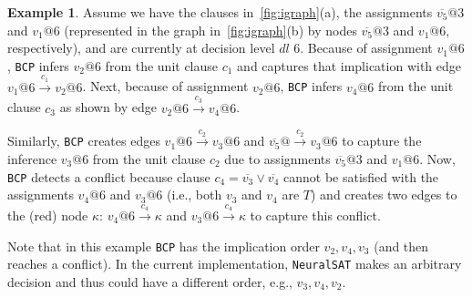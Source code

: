 \documentclass[oneside,11pt,dvipsnames]{book}
\numberwithin{equation}{section}
\theoremstyle{definition}
\newtheorem{example}{Example}[section]
\theoremstyle{remark}
\newcommand{\tvn}[1]{\iftoggle{usecomment}{{\color{red}{[TVN]: #1}}}{}}
\newcommand{\tool}{\texttt{NeuralSAT}}
\begin{document}
\begin{example}
    Assume we have the clauses in~\autoref{fig:igraph}(a), the assignments $\overline{v_5}@3$ and $v_1@6$ (represented in the graph in~\autoref{fig:igraph}(b) by nodes  $\overline{v_5}@3$ and $v_1@6$, respectively), and are currently at decision level $dl$ 6.
Because of assignment $v_1@6$, \texttt{BCP} infers $v_2@6$ from the unit clause $c_1$ and captures that implication with edge $v_1@6 \xrightarrow{c_1} v_2@6$.
Next, because of assignment $v_2@6$, \texttt{BCP} infers $v_4@6$ from the unit clause $c_3$ as shown by edge $v_2@6 \xrightarrow{c_3} v_4@6$.

Similarly, \texttt{BCP} creates edges $v_1@6 \xrightarrow{c_2} v_3@6$ and $\overline{v_5}@ \xrightarrow{c_2} v_3@6$ to capture  the inference $v_3@6$ from the unit clause $c_2$ due to assignments $\overline{v_5}@3$ and $v_1@6$.
Now, \texttt{BCP} detects a conflict because clause $c_4=\overline{v_3} \lor \overline{v_4}$ cannot be satisfied with the assignments $v_4@6$ and $v_3@6$ (i.e., both $v_3$ and $v_4$ are $T$)  and creates two edges to the (red) node $\kappa$: $v_4@6 \xrightarrow{c_4} \kappa$ and $v_3@6 \xrightarrow{c_4} \kappa$ to capture this conflict.

Note that in this example \texttt{BCP} has the implication order $v_2,v_4,v_3$ (and then reaches a conflict). In the current implementation, \tool{} makes an arbitrary decision and thus could have a different order, e.g., $v_3, v_4,v_2$.
\end{example}




\end{document}
